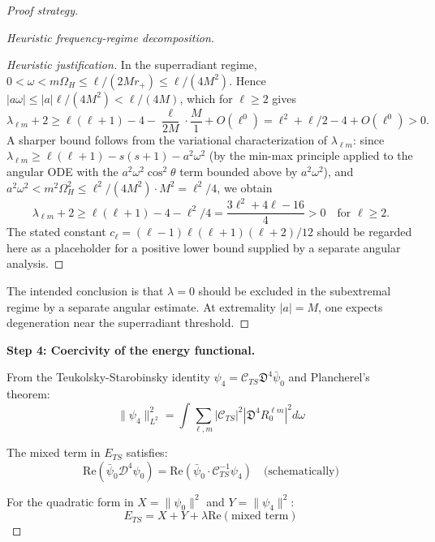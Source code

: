 \documentclass[12pt,a4paper]{article}
\begin{document}
\begin{proof}[Proof strategy]
\begin{proof}[Heuristic frequency-regime decomposition]
\begin{proof}[Heuristic justification]
In the superradiant regime, $0 < \omega < m\Omega_H \le \ell/(2Mr_+) \le \ell/(4M^2)$. Hence $|a\omega| \le |a|\ell/(4M^2) < \ell/(4M)$, which for $\ell \ge 2$ gives
\begin{equation}
\lambda_{\ell m} + 2 \ge \ell(\ell+1) - 4 - \frac{\ell}{2M}\cdot\frac{M}{1} + O(\ell^0)
  = \ell^2 + \ell/2 - 4 + O(\ell^0) > 0.
\end{equation}
A sharper bound follows from the variational characterization of $\lambda_{\ell m}$: since $\lambda_{\ell m} \ge \ell(\ell+1) - s(s+1) - a^2\omega^2$ (by the min-max principle applied to the angular ODE with the $a^2\omega^2\cos^2\theta$ term bounded above by $a^2\omega^2$), and $a^2\omega^2 < m^2\Omega_H^2 \le \ell^2/(4M^2) \cdot M^2 = \ell^2/4$, we obtain
\begin{equation}
\lambda_{\ell m} + 2 \ge \ell(\ell+1) - 4 - \ell^2/4 = \frac{3\ell^2 + 4\ell - 16}{4} > 0
\quad\text{for }\ell \ge 2.
\end{equation}
The stated constant $c_\ell = (\ell-1)\ell(\ell+1)(\ell+2)/12$ should be regarded here as a placeholder for a positive lower bound supplied by a separate angular analysis.
\end{proof}

The intended conclusion is that $\lambda = 0$ should be excluded in the subextremal regime by a separate angular estimate. At extremality $|a| = M$, one expects degeneration near the superradiant threshold.
\end{proof}

\textbf{Step 4: Coercivity of the energy functional.}

From the Teukolsky-Starobinsky identity $\psi_4 = \mathcal{C}_{TS}\mathfrak{D}^4\bar{\psi}_0$ and Plancherel's theorem:
\begin{equation}
\|\psi_4\|_{L^2}^2 = \int \sum_{\ell,m}|\mathcal{C}_{TS}|^2|\mathfrak{D}^4 R_0^{\ell m}|^2 d\omega
\end{equation}

The mixed term in $E_{TS}$ satisfies:
\begin{equation}
\text{Re}(\bar{\psi}_0 \mathcal{D}^4\psi_0) = \text{Re}\left(\bar{\psi}_0 \cdot \mathcal{C}_{TS}^{-1}\psi_4\right) \quad \text{(schematically)}
\end{equation}

For the quadratic form in $X = \|\psi_0\|^2$ and $Y = \|\psi_4\|^2$:
\begin{equation}
E_{TS} = X + Y + \lambda \text{Re}(\text{mixed term})
\end{equation}


\end{proof}
\end{document}
